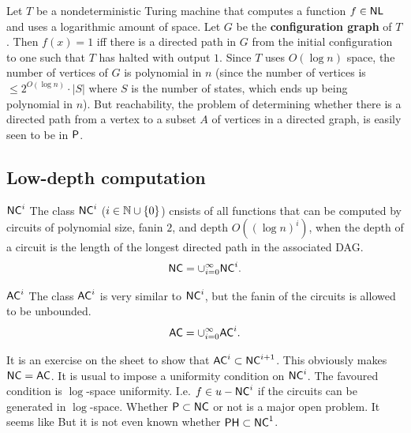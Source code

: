 \documentclass{article}
\begin{document}
\proof Let $T$ be a nondeterministic Turing machine that computes a function $f \in \mathsf{NL}$ and uses a logarithmic amount of space. 
\newlec Let $G$ be the \textbf{configuration graph} of $T$. Then $f(x)=1$ iff there is a directed path in $G$ from the initial configuration to one such that $T$ has halted with output $1$. Since $T$ uses $O(\log n)$ space, the number of vertices of $G$ is polynomial in $n$ (since the number of vertices is $\leq 2^{O(\log n)} \cdot |S|$ where $S$ is the number of states, which ends up being polynomial in $n$). But reachability, the problem of determining whether there is a directed path from a vertex to a subset $A$ of vertices in a directed graph, is easily seen to be in $\mathsf{P}$. \endproof 
\subsection{Low-depth computation}
\begin{fancydefine}{$\mathsf{NC}^{i}$}
    The class $\mathsf{NC}^{i}$ ($i \in \mathbb{N} \cup \{0\}$) cnsists of all functions that can be computed by circuits of polynomial size, fanin $2$, and depth $O((\log n)^{i})$, when the depth of a circuit is the length of the longest directed path in the associated DAG. \[ \mathsf{NC} = \cup_{i=0}^{\infty} \mathsf{NC}^{i}.\]
\end{fancydefine}
\begin{fancydefine}{$\mathsf{AC}^{i}$}
    The class $\mathsf{AC}^{i}$ is very similar to $\mathsf{NC}^{i}$, but the fanin of the circuits is allowed to be unbounded. \[ \mathsf{AC} = \cup_{i=0}^{\infty} \mathsf{AC}^{i}.\]
\end{fancydefine}
It is an exercise on the sheet to show that $\mathsf{AC}^{i} \subset \mathsf{NC}^{i+1}$. This obviously makes $\mathsf{NC} = \mathsf{AC}$.\gap 
It is usual to impose a uniformity condition on $\mathsf{NC}^{i}$. The favoured condition is $\log$-space uniformity. I.e. $f \in u-\mathsf{NC}^{i}$ if the circuits can be generated in $\log$-space.\gap 
Whether $\mathsf{P} \subset \mathsf{NC}$ or not is a major open problem. It seems like  But it is not even known whether $\mathsf{PH} \subset \mathsf{NC}^{1}$.
\end{document}
